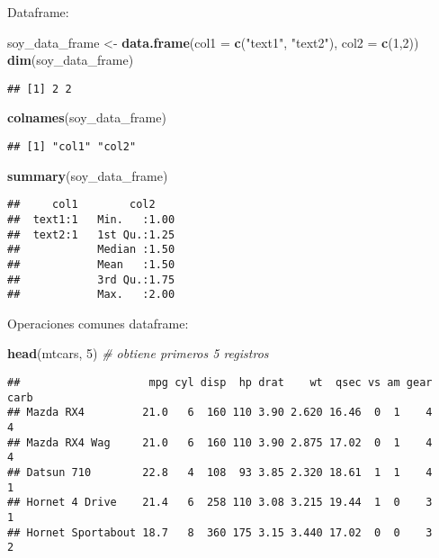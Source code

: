 \documentclass[]{book}
\newenvironment{Shaded}{\begin{snugshade}}{\end{snugshade}}
\newcommand{\CommentTok}[1]{\textcolor[rgb]{0.56,0.35,0.01}{\textit{#1}}}
\newcommand{\DataTypeTok}[1]{\textcolor[rgb]{0.13,0.29,0.53}{#1}}
\newcommand{\DecValTok}[1]{\textcolor[rgb]{0.00,0.00,0.81}{#1}}
\newcommand{\KeywordTok}[1]{\textcolor[rgb]{0.13,0.29,0.53}{\textbf{#1}}}
\newcommand{\NormalTok}[1]{#1}
\newcommand{\StringTok}[1]{\textcolor[rgb]{0.31,0.60,0.02}{#1}}
\begin{document}
Dataframe:

\begin{Shaded}
\begin{Highlighting}[]
\NormalTok{soy_data_frame <-}\StringTok{ }\KeywordTok{data.frame}\NormalTok{(}\DataTypeTok{col1 =} \KeywordTok{c}\NormalTok{(}\StringTok{"text1"}\NormalTok{, }\StringTok{"text2"}\NormalTok{), }\DataTypeTok{col2 =} \KeywordTok{c}\NormalTok{(}\DecValTok{1}\NormalTok{,}\DecValTok{2}\NormalTok{))}
\KeywordTok{dim}\NormalTok{(soy_data_frame)}
\end{Highlighting}
\end{Shaded}

\begin{verbatim}
## [1] 2 2
\end{verbatim}

\begin{Shaded}
\begin{Highlighting}[]
\KeywordTok{colnames}\NormalTok{(soy_data_frame)}
\end{Highlighting}
\end{Shaded}

\begin{verbatim}
## [1] "col1" "col2"
\end{verbatim}

\begin{Shaded}
\begin{Highlighting}[]
\KeywordTok{summary}\NormalTok{(soy_data_frame)}
\end{Highlighting}
\end{Shaded}

\begin{verbatim}
##     col1        col2     
##  text1:1   Min.   :1.00  
##  text2:1   1st Qu.:1.25  
##            Median :1.50  
##            Mean   :1.50  
##            3rd Qu.:1.75  
##            Max.   :2.00
\end{verbatim}

Operaciones comunes dataframe:

\begin{Shaded}
\begin{Highlighting}[]
\KeywordTok{head}\NormalTok{(mtcars, }\DecValTok{5}\NormalTok{) }\CommentTok{# obtiene primeros 5 registros}
\end{Highlighting}
\end{Shaded}

\begin{verbatim}
##                    mpg cyl disp  hp drat    wt  qsec vs am gear carb
## Mazda RX4         21.0   6  160 110 3.90 2.620 16.46  0  1    4    4
## Mazda RX4 Wag     21.0   6  160 110 3.90 2.875 17.02  0  1    4    4
## Datsun 710        22.8   4  108  93 3.85 2.320 18.61  1  1    4    1
## Hornet 4 Drive    21.4   6  258 110 3.08 3.215 19.44  1  0    3    1
## Hornet Sportabout 18.7   8  360 175 3.15 3.440 17.02  0  0    3    2
\end{verbatim}
\end{document}
